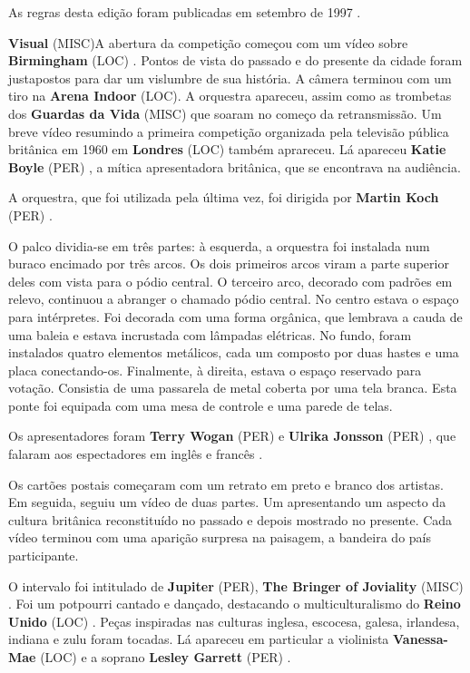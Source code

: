 \documentclass[12pt,a4paper]{article}
\begin{document}
As regras desta edição foram publicadas em setembro de 1997 .



\textbf{Visual} (MISC)A abertura da competição começou com um vídeo sobre \textbf{Birmingham} (LOC) . Pontos de vista do passado e do presente da cidade foram justapostos para dar um vislumbre de sua história. A câmera terminou com um tiro na \textbf{Arena Indoor} (LOC). A orquestra apareceu, assim como as trombetas dos \textbf{Guardas da Vida} (MISC) que soaram no começo da retransmissão. Um breve vídeo resumindo a primeira competição organizada pela televisão pública britânica em 1960 em \textbf{Londres} (LOC) também aprareceu. Lá apareceu \textbf{Katie Boyle} (PER) , a mítica apresentadora britânica, que se encontrava na audiência.

A orquestra, que foi utilizada pela última vez, foi dirigida por \textbf{Martin Koch} (PER) .

O palco dividia-se em três partes: à esquerda, a orquestra foi instalada num buraco encimado por três arcos. Os dois primeiros arcos viram a parte superior deles com vista para o pódio central. O terceiro arco, decorado com padrões em relevo, continuou a abranger o chamado pódio central. No centro estava o espaço para intérpretes. Foi decorada com uma forma orgânica, que lembrava a cauda de uma baleia e estava incrustada com lâmpadas elétricas. No fundo, foram instalados quatro elementos metálicos, cada um composto por duas hastes e uma placa conectando-os. Finalmente, à direita, estava o espaço reservado para votação. Consistia de uma passarela de metal coberta por uma tela branca. Esta ponte foi equipada com uma mesa de controle e uma parede de telas.

Os apresentadores foram \textbf{Terry Wogan} (PER) e \textbf{Ulrika Jonsson} (PER) , que falaram aos espectadores em inglês e francês .

Os cartões postais começaram com um retrato em preto e branco dos artistas. Em seguida, seguiu um vídeo de duas partes. Um apresentando um aspecto da cultura britânica reconstituído no passado e depois mostrado no presente. Cada vídeo terminou com uma aparição surpresa na paisagem, a bandeira do país participante.

O intervalo foi intitulado de \textbf{Jupiter} (PER), \textbf{The Bringer of Joviality} (MISC) . Foi um potpourri cantado e dançado, destacando o multiculturalismo do \textbf{Reino Unido} (LOC) . Peças inspiradas nas culturas inglesa, escocesa, galesa, irlandesa, indiana e zulu foram tocadas. Lá apareceu em particular a violinista \textbf{Vanessa-Mae} (LOC) e a soprano \textbf{Lesley Garrett} (PER) .
\end{document}
